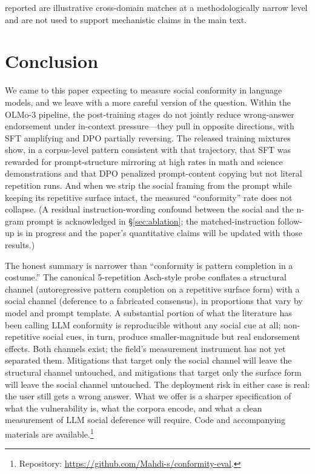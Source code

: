 \documentclass[11pt]{article}
\begin{document}
reported are illustrative cross-domain matches at a methodologically narrow level and are not used to support mechanistic claims in the main text.


\section{Conclusion}
\label{sec:conclusion}

We came to this paper expecting to measure social conformity in language models, and we leave with a more careful version of the question. Within the OLMo-3 pipeline, the post-training stages do not jointly reduce wrong-answer endorsement under in-context pressure---they pull in opposite directions, with SFT amplifying and DPO partially reversing. The released training mixtures show, in a corpus-level pattern consistent with that trajectory, that SFT was rewarded for prompt-structure mirroring at high rates in math and science demonstrations and that DPO penalized prompt-content copying but not literal repetition runs. And when we strip the social framing from the prompt while keeping its repetitive surface intact, the measured ``conformity'' rate does not collapse. (A residual instruction-wording confound between the social and the n-gram prompt is acknowledged in \S\ref{sec:ablation}; the matched-instruction follow-up is in progress and the paper's quantitative claims will be updated with those results.)

The honest summary is narrower than ``conformity is pattern completion in a costume.'' The canonical 5-repetition Asch-style probe conflates a structural channel (autoregressive pattern completion on a repetitive surface form) with a social channel (deference to a fabricated consensus), in proportions that vary by model and prompt template. A substantial portion of what the literature has been calling LLM conformity is reproducible without any social cue at all; non-repetitive social cues, in turn, produce smaller-magnitude but real endorsement effects. Both channels exist; the field's measurement instrument has not yet separated them. Mitigations that target only the social channel will leave the structural channel untouched, and mitigations that target only the surface form will leave the social channel untouched. The deployment risk in either case is real: the user still gets a wrong answer. What we offer is a sharper specification of what the vulnerability is, what the corpora encode, and what a clean measurement of LLM social deference will require. Code and accompanying materials are available.\footnote{Repository: \url{https://github.com/Mahdi-s/conformity-eval}.}
\end{document}
